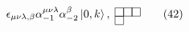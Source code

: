 \begin{equation}
\epsilon _{\mu \nu \lambda ,\beta }\alpha _{-1}^{\mu \nu \lambda }\alpha
_{-2}^{\beta }\left\vert 0,k\right\rangle ,\hspace{0.1cm}\raisebox{0.06in}{%
\fbox{\rule[0.04cm]{0.04cm}{0cm}}}\hspace{-0.094in}\hspace{-0.04cm}%
\raisebox{-.047in}{\fbox{\rule[0.04cm]{0.04cm}{0cm}}}\hspace{-0.006in}%
\hspace{-0.006in}\hspace{0.02cm}\raisebox{0.06in}{\fbox{%
\rule[0.04cm]{0.04cm}{0cm}}}\hspace{-0.025cm}\raisebox{0.06in}{\fbox{%
\rule[0.04cm]{0.04cm}{0cm}}}  \tag{42}
\end{equation}

